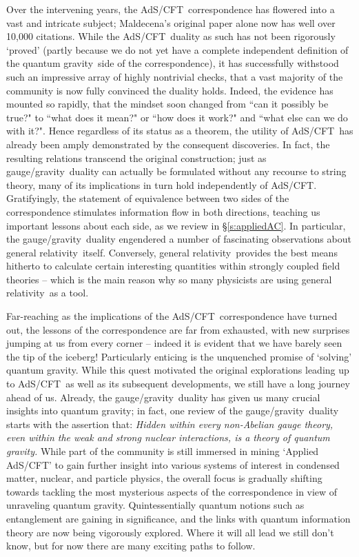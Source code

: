 \documentclass[12pt,a4paper]{article}
\def\sect#1{\S\ref{#1}}
\def\AC{AdS/CFT}
\def\GG{gauge/gravity}
\def\GR{general relativity}
\def\STY{string theory}
\def\QG{quantum gravity}
\begin{document}
Over the intervening years, the \AC\ correspondence has flowered into a vast and intricate subject; Maldecena's original paper \cite{Maldacena:1997re} alone now has well over 10,000 citations.  While the \AC\ duality as such has not been rigorously `proved' (partly because we do not yet have a complete independent definition of the \QG\  side of the correspondence), it has successfully withstood such an impressive array of highly nontrivial checks, that a vast majority of the community is now  fully convinced the duality holds.  Indeed, the evidence has mounted so rapidly, that the mindset soon changed from ``can it possibly be true?"  to ``what does it mean?" or ``how does it work?" and ``what else can we do with it?".
Hence regardless of its status as a theorem,  the utility of \AC\ has already been amply demonstrated by the consequent discoveries.  In fact, the resulting relations transcend the original construction; just as \GG\ duality can actually be formulated without any recourse to \STY, 
many of its implications in turn hold independently of  \AC.
Gratifyingly, the statement of equivalence between two sides of the correspondence stimulates information flow in both directions, teaching us important lessons about each side, as we review in \sect{s:appliedAC}.  
In particular, the \GG\ duality engendered  a number of fascinating observations about \GR\ itself.
Conversely,  \GR\ provides the best means hitherto 
to calculate certain interesting quantities within strongly coupled field theories -- which is the main reason why so many physicists are using \GR\ as a tool.  

Far-reaching as the implications of the \AC\ correspondence have turned out, the lessons of the correspondence are far from exhausted, with new surprises jumping at us from every corner -- indeed it is evident that we have barely seen the tip of the iceberg!  
Particularly enticing is the unquenched promise of `solving' \QG.  While this quest motivated the original explorations leading up to \AC\ as well as its subsequent developments, we still have a long journey ahead of us.  Already, the \GG\ duality has given us many crucial insights into \QG; in fact,  one review of the \GG\ duality \cite{Horowitz:2006ct} starts with the assertion that: {\it Hidden within every non-Abelian gauge theory, even within the weak and strong nuclear interactions, is a theory of quantum gravity.}  While part of the community is still immersed in mining `Applied \AC' to gain further insight into various systems of interest in condensed matter, nuclear, and particle physics, the overall focus is gradually shifting towards tackling the most mysterious aspects of the correspondence in view of unraveling \QG.  Quintessentially quantum notions such as entanglement are gaining in significance, and the links with quantum information theory are now being vigorously explored.  Where it will all lead we still don't know, but for now there are many exciting paths to follow.
\end{document}
